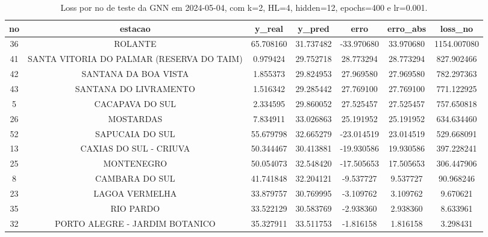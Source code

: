 \begin{table}[h]
\centering
\caption{Loss por no de teste da GNN em 2024-05-04, com k=2, HL=4, hidden=12, epochs=400 e lr=0.001.}
\label{tab:gnn_loss_k2_hl4_h12_e400_d20240504}
\begin{tabular}{ccccccc}
\toprule
no & estacao & y\_real & y\_pred & erro & erro\_abs & loss\_no \\
\midrule
36 & ROLANTE & 65.708160 & 31.737482 & -33.970680 & 33.970680 & 1154.007080 \\
41 & SANTA VITORIA DO PALMAR (RESERVA DO TAIM) & 0.979424 & 29.752718 & 28.773294 & 28.773294 & 827.902466 \\
42 & SANTANA DA BOA VISTA & 1.855373 & 29.824953 & 27.969580 & 27.969580 & 782.297363 \\
43 & SANTANA DO LIVRAMENTO & 1.516342 & 29.285442 & 27.769100 & 27.769100 & 771.122925 \\
5 & CACAPAVA DO SUL & 2.334595 & 29.860052 & 27.525457 & 27.525457 & 757.650818 \\
26 & MOSTARDAS & 7.834911 & 33.026863 & 25.191952 & 25.191952 & 634.634460 \\
52 & SAPUCAIA DO SUL & 55.679798 & 32.665279 & -23.014519 & 23.014519 & 529.668091 \\
13 & CAXIAS DO SUL - CRIUVA & 50.344467 & 30.413881 & -19.930586 & 19.930586 & 397.228241 \\
25 & MONTENEGRO & 50.054073 & 32.548420 & -17.505653 & 17.505653 & 306.447906 \\
8 & CAMBARA DO SUL & 41.741848 & 32.204121 & -9.537727 & 9.537727 & 90.968246 \\
23 & LAGOA VERMELHA & 33.879757 & 30.769995 & -3.109762 & 3.109762 & 9.670621 \\
35 & RIO PARDO & 33.522129 & 30.583769 & -2.938360 & 2.938360 & 8.633961 \\
32 & PORTO ALEGRE - JARDIM BOTANICO & 35.327911 & 33.511753 & -1.816158 & 1.816158 & 3.298431 \\
\bottomrule
\end{tabular}
\end{table}
